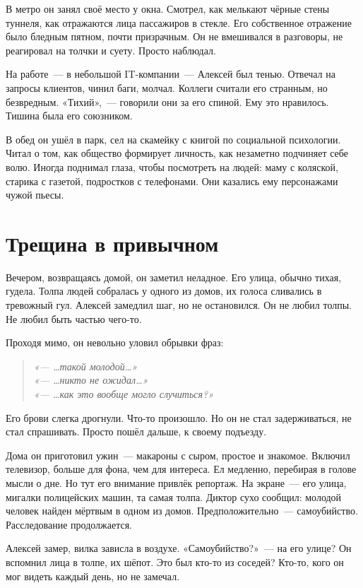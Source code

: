 \documentclass[12pt,a4paper]{book}
\newenvironment{dialogue}{\begin{quote}\itshape}{\end{quote}} %
\begin{document}
В метро он занял своё место у окна. Смотрел, как мелькают чёрные стены туннеля, как отражаются лица пассажиров в стекле. Его собственное отражение было бледным пятном, почти призрачным. Он не вмешивался в разговоры, не реагировал на толчки и суету. Просто наблюдал.

На работе~--- в небольшой IT-компании~--- Алексей был тенью. Отвечал на запросы клиентов, чинил баги, молчал. Коллеги считали его странным, но безвредным. «Тихий»,~--- говорили они за его спиной. Ему это нравилось. Тишина была его союзником.

В обед он ушёл в парк, сел на скамейку с книгой по социальной психологии. Читал о том, как общество формирует личность, как незаметно подчиняет себе волю. Иногда поднимал глаза, чтобы посмотреть на людей: маму с коляской, старика с газетой, подростков с телефонами. Они казались ему персонажами чужой пьесы.

\section{Трещина в привычном}

Вечером, возвращаясь домой, он заметил неладное. Его улица, обычно тихая, гудела. Толпа людей собралась у одного из домов, их голоса сливались в тревожный гул. Алексей замедлил шаг, но не остановился. Он не любил толпы. Не любил быть частью чего-то.

Проходя мимо, он невольно уловил обрывки фраз:

\begin{dialogue}
«--- \ldots такой молодой\ldots»\\[0.5em]
«--- \ldots никто не ожидал\ldots»\\[0.5em]
«--- \ldots как это вообще могло случиться?»
\end{dialogue}

Его брови слегка дрогнули. Что-то произошло. Но он не стал задерживаться, не стал спрашивать. Просто пошёл дальше, к своему подъезду.

Дома он приготовил ужин~--- макароны с сыром, простое и знакомое. Включил телевизор, больше для фона, чем для интереса. Ел медленно, перебирая в голове мысли о дне. Но тут его внимание привлёк репортаж. На экране~--- его улица, мигалки полицейских машин, та самая толпа. Диктор сухо сообщил: молодой человек найден мёртвым в одном из домов. Предположительно~--- самоубийство. Расследование продолжается.

Алексей замер, вилка зависла в воздухе. «Самоубийство?»~--- на его улице? Он вспомнил лица в толпе, их шёпот. Это был кто-то из соседей? Кто-то, кого он мог видеть каждый день, но не замечал.
\end{document}
